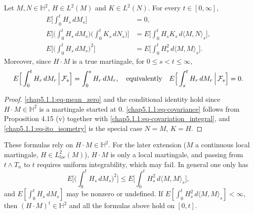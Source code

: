 \begin{corollary} \label{chap5.1.1:corollary-moments}
Let $M, N \in \mathbb{H}^2$, $H \in L^2(M)$ and $K \in L^2(N)$. For every $t \in [0,\infty]$,
\begin{align}
    E\Big[\int_0^t H_s\, dM_s\Big] &= 0, \label{chap5.1.1:eq-mean_zero}\\
    E\Big[\Big(\int_0^t H_s\, dM_s\Big)\Big(\int_0^t K_s\, dN_s\Big)\Big] &= E\Big[\int_0^t H_s K_s \, d\langle M,N\rangle_s\Big], \label{chap5.1.1:eq-covariance}\\
    E\Big[\Big(\int_0^t H_s\, dM_s\Big)^2\Big] &= E\Big[\int_0^t H_s^2 \, d\langle M,M\rangle_s\Big]. \label{chap5.1.1:eq-ito_isometry}
\end{align}
Moreover, since $H \cdot M$ is a true martingale, for $0 \le s < t \le \infty$,
$$E\Big[\int_0^t H_r\, dM_r \,\Big|\, \mathcal{F}_s\Big] = \int_0^s H_r\, dM_r, \quad \text{equivalently} \quad E\Big[\int_s^t H_r\, dM_r \,\Big|\, \mathcal{F}_s\Big] = 0.$$
\end{corollary}

\begin{proof}
\eqref{chap5.1.1:eq-mean_zero} and the conditional identity hold since $H \cdot M \in \mathbb{H}^2$ is a martingale started at $0$. \eqref{chap5.1.1:eq-covariance} follows from Proposition 4.15 (v) together with \eqref{chap5.1.1:eq-covariation_integral}, and \eqref{chap5.1.1:eq-ito_isometry} is the special case $N = M$, $K = H$.
\end{proof}

\begin{remark}
These formulas rely on $H \cdot M \in \mathbb{H}^2$. For the later extension ($M$ a continuous local martingale, $H \in L^2_{loc}(M)$), $H \cdot M$ is only a local martingale, and passing from $t \wedge T_n$ to $t$ requires uniform integrability, which may fail. In general one only has
$$E\Big[\Big(\int_0^t H_s\, dM_s\Big)^2\Big] \le E\Big[\int_0^t H_s^2\, d\langle M,M\rangle_s\Big],$$
and $E[\int_0^t H_s\,dM_s]$ may be nonzero or undefined. If $E[\int_0^t H_s^2\, d\langle M,M\rangle_s] < \infty$, then $(H\cdot M)^t \in \mathbb{H}^2$ and all the formulas above hold on $[0,t]$.
\end{remark}


